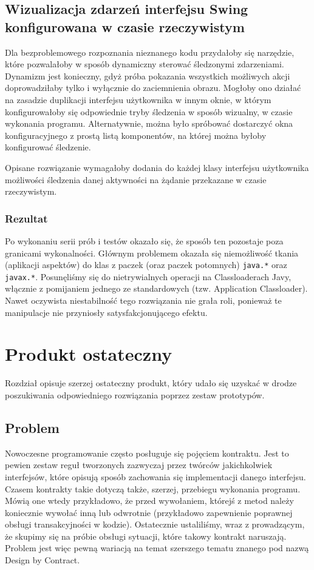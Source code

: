 \documentclass[12pt,a4paper,titlepage]{article}
\begin{document}
 \subsection{Wizualizacja zdarzeń interfejsu Swing konfigurowana w czasie rzeczywistym}
 Dla bezproblemowego rozpoznania nieznanego kodu przydałoby się narzędzie, które pozwalałoby w sposób dynamiczny sterować śledzonymi zdarzeniami. Dynamizm jest konieczny, gdyż próba pokazania wszystkich możliwych akcji doprowadziłaby tylko i wyłącznie do zaciemnienia obrazu. Mogłoby ono działać na zasadzie duplikacji interfejsu użytkownika w innym oknie, w którym konfigurowałoby się odpowiednie tryby śledzenia w sposób wizualny, w czasie wykonania programu. Alternatywnie, można było spróbować dostarczyć okna konfiguracyjnego z prostą listą komponentów, na której można byłoby konfigurować śledzenie.
 
 Opisane rozwiązanie wymagałoby dodania do każdej klasy interfejsu użytkownika możliwości śledzenia danej aktywności na żądanie przekazane w czasie rzeczywistym.
 
  \subsubsection*{Rezultat}
   Po wykonaniu serii prób i testów okazało się, że sposób ten pozostaje poza granicami wykonalności. Głównym problemem okazała się niemożliwość tkania (aplikacji aspektów) do klas z paczek (oraz paczek potomnych) \texttt{java.*} oraz \texttt{javax.*}. Posunęliśmy się do nietrywialnych operacji na Classloaderach Javy, włącznie z pomijaniem jednego ze standardowych (tzw. Application Classloader). Nawet oczywista niestabilność tego rozwiązania nie grała roli, ponieważ te manipulacje nie przyniosły satysfakcjonującego efektu.
   
\section{Produkt ostateczny}
 Rozdział opisuje szerzej ostateczny produkt, który udało się uzyskać w drodze poszukiwania odpowiedniego rozwiązania poprzez zestaw prototypów. 
  
 \subsection{Problem}
  Nowoczesne programowanie często posługuje się pojęciem kontraktu. Jest to pewien zestaw reguł tworzonych zazwyczaj przez twórców jakichkolwiek interfejsów, które opisują sposób zachowania się implementacji danego interfejsu. Czasem kontrakty takie dotyczą także, szerzej, przebiegu wykonania programu. Mówią one wtedy przykładowo, że przed wywołaniem, którejś z metod należy koniecznie wywołać inną lub odwrotnie (przykładowo zapewnienie poprawnej obsługi transakcyjności w kodzie). Ostatecznie ustaliliśmy, wraz z prowadzącym, że skupimy się na próbie obsługi sytuacji, które takowy kontrakt naruszają. Problem jest więc pewną wariacją na temat szerszego tematu znanego pod nazwą Design by Contract.
   
\end{document}
